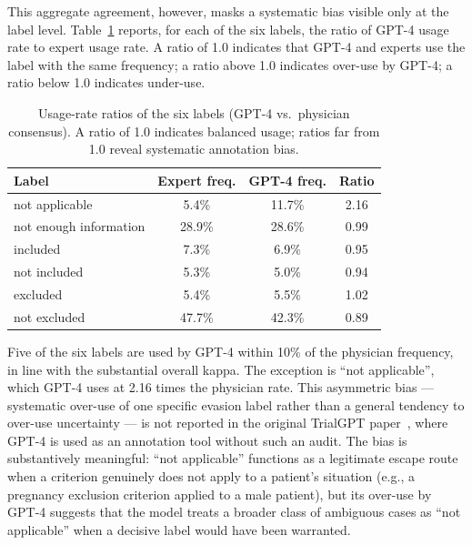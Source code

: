 This aggregate agreement, however, masks a systematic bias visible only 
at the label level. Table~\ref{tab:res-gpt4-bias} reports, for each of 
the six labels, the ratio of GPT-4 usage rate to expert usage rate. A 
ratio of 1.0 indicates that GPT-4 and experts use the label with the 
same frequency; a ratio above 1.0 indicates over-use by GPT-4; a ratio 
below 1.0 indicates under-use.

\begin{table}[htbp]
    \centering
    \caption{Usage-rate ratios of the six labels (GPT-4 vs.\ physician 
        consensus). A ratio of 1.0 indicates balanced usage; ratios far 
        from 1.0 reveal systematic annotation bias.}
    \label{tab:res-gpt4-bias}
    \small
    \begin{tabular}{@{}lccc@{}}
        \toprule
        \textbf{Label} & \textbf{Expert freq.} & \textbf{GPT-4 freq.} & \textbf{Ratio} \\
        \midrule
        not applicable         & 5.4\%  & 11.7\% & 2.16 \\
        not enough information & 28.9\% & 28.6\% & 0.99 \\
        included               & 7.3\%  & 6.9\%  & 0.95 \\
        not included           & 5.3\%  & 5.0\%  & 0.94 \\
        excluded               & 5.4\%  & 5.5\%  & 1.02 \\
        not excluded           & 47.7\% & 42.3\% & 0.89 \\
        \bottomrule
    \end{tabular}
\end{table}

Five of the six labels are used by GPT-4 within 10\% of the physician 
frequency, in line with the substantial overall kappa. The exception is 
``not applicable'', which GPT-4 uses at 2.16 times the physician rate. 
This asymmetric bias --- systematic over-use of one specific evasion 
label rather than a general tendency to over-use uncertainty --- is not 
reported in the original TrialGPT paper~\cite{jin2024trialgpt}, where 
GPT-4 is used as an annotation tool without such an audit. The bias is 
substantively meaningful: ``not applicable'' functions as a legitimate 
escape route when a criterion genuinely does not apply to a patient's 
situation (e.g., a pregnancy exclusion criterion applied to a male 
patient), but its over-use by GPT-4 suggests that the model treats a 
broader class of ambiguous cases as ``not applicable'' when a decisive 
label would have been warranted.

